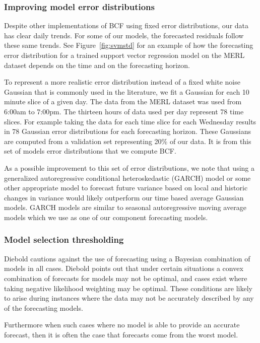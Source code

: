 \subsubsection{Improving model error distributions}
Despite other implementations of BCF using fixed error distributions, our data has clear daily trends.  For some of our models, the forecasted residuals follow these same trends.  See Figure~\ref{fig:svmstd} for an example of how the forecasting error distribution for a trained support vector regression model on the MERL dataset depends on the time and on the forecasting horizon.

To represent a more realistic error distribution instead of a fixed white noise Gaussian that is commonly used in the literature, we fit a Gaussian for each 10 minute slice of a given day.  The data from the MERL dataset was used from 6:00am to 7:00pm. The thirteen hours of data used per day represent 78 time slices.  For example taking the data for each time slice for each Wednesday results in 78 Gaussian error distributions for each forecasting horizon.  These Gaussians are computed from a validation set representing 20\% of our data.  It is from this set of models error distributions that we compute BCF.

As a possible improvement to this set of error distributions, we note that using a generalized autoregressive conditional heteroskedastic (GARCH) model \cite{Box2008} or some other appropriate model to forecast future variance based on local and historic changes in variance would likely outperform our time based average Gaussian models.  GARCH models are similar to seasonal autoregressive moving average models which we use as one of our component forecasting models.

\subsubsection{Model selection thresholding}
Diebold \cite{Diebold1991} cautions against the use of forecasting using a Bayesian combination of models in all cases.  Diebold points out that under certain situations a convex combination of forecasts for models may not be optimal, and cases exist where taking negative likelihood weighting may be optimal.  These conditions are likely to arise during instances where the data may not be accurately described by any of the forecasting models.  

Furthermore when such cases where no model is able to provide an accurate forecast, then it is often the case that forecasts come from the worst model.  

